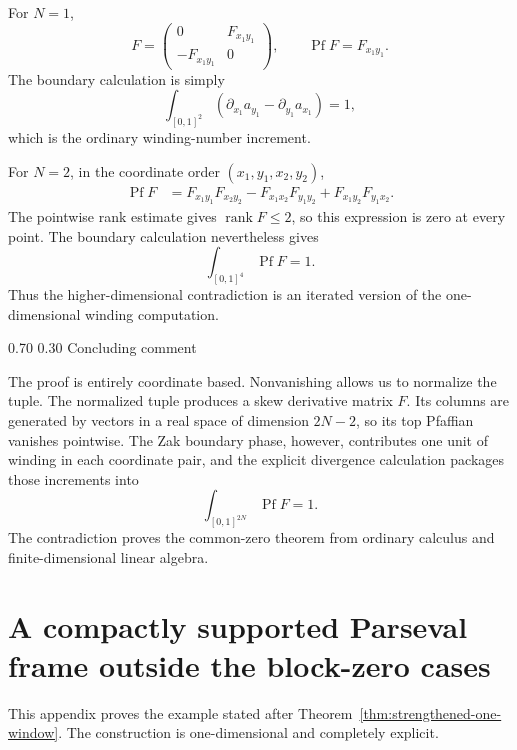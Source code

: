 \documentclass[11pt,reqno]{amsart}
\makeatletter
\numberwithin{equation}{section}
\renewcommand\subsubsection{\@startsection{subsubsection}{3}{\z@}%
  {0.70\baselineskip \@plus 0.20\baselineskip \@minus 0.10\baselineskip}%
  {0.30\baselineskip}%
  {\normalfont\bfseries}}
\theoremstyle{definition}
\theoremstyle{remark}
\newcommand{\rank}{\operatorname{rank}}
\newcommand{\Pf}{\operatorname{Pf}}
\makeatother
\begin{document}
For $N=1$,
\[
 F=
 \begin{pmatrix}
 0&F_{x_1y_1}\\
 -F_{x_1y_1}&0
 \end{pmatrix},
 \qquad
 \Pf F=F_{x_1y_1}.
\]
The boundary calculation is simply
\[
 \int_{[0,1]^2}
 (\partial_{x_1}a_{y_1}-\partial_{y_1}a_{x_1})=1,
\]
which is the ordinary winding-number increment.

For $N=2$, in the coordinate order
$(x_1,y_1,x_2,y_2)$,
\begin{align*}
 \Pf F
 &=F_{x_1y_1}F_{x_2y_2}
   -F_{x_1x_2}F_{y_1y_2}
   +F_{x_1y_2}F_{y_1x_2}.
\end{align*}
The pointwise rank estimate gives $\rank F\le2$, so this expression is zero
at every point.  The boundary calculation nevertheless gives
\[
 \int_{[0,1]^4}\Pf F=1.
\]
Thus the higher-dimensional contradiction is an iterated version of the
one-dimensional winding computation.

\subsubsection{Concluding comment}

The proof is entirely coordinate based.  Nonvanishing allows us to
normalize the tuple.  The normalized tuple produces a skew derivative
matrix $F$.  Its columns are generated by vectors in a real space of
dimension $2N-2$, so its top Pfaffian vanishes pointwise.  The Zak boundary
phase, however, contributes one unit of winding in each coordinate pair,
and the explicit divergence calculation packages those increments into
\[
 \int_{[0,1]^{2N}}\Pf F=1.
\]
The contradiction proves the common-zero theorem from ordinary calculus
and finite-dimensional linear algebra.

\section{A compactly supported Parseval frame outside the block-zero cases}
\label{app:compact-parseval-example}

This appendix proves the example stated after
Theorem~\ref{thm:strengthened-one-window}.  The construction is one-dimensional
and completely explicit.
\end{document}
